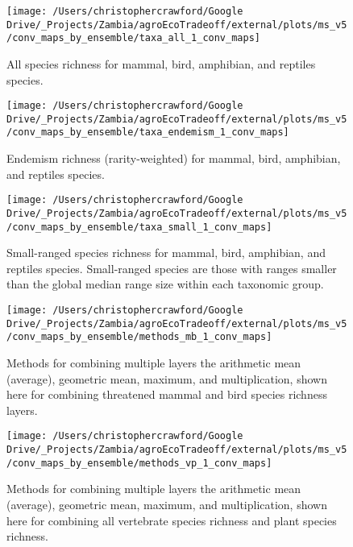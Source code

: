 \documentclass[
]{article}
\begin{document}
\begin{figure}
\texttt{[image: /Users/christophercrawford/Google Drive/\_Projects/Zambia/agroEcoTradeoff/external/plots/ms\_v5/conv\_maps\_by\_ensemble/taxa\_all\_1\_conv\_maps]} \caption{All species richness for mammal, bird, amphibian, and reptiles species.}\label{fig:conv-maps-taxa-all-1}
\end{figure}

\begin{figure}
\texttt{[image: /Users/christophercrawford/Google Drive/\_Projects/Zambia/agroEcoTradeoff/external/plots/ms\_v5/conv\_maps\_by\_ensemble/taxa\_endemism\_1\_conv\_maps]} \caption{Endemism richness (rarity-weighted) for mammal, bird, amphibian, and reptiles species.}\label{fig:conv-maps-taxa-endemism-1}
\end{figure}

\begin{figure}
\texttt{[image: /Users/christophercrawford/Google Drive/\_Projects/Zambia/agroEcoTradeoff/external/plots/ms\_v5/conv\_maps\_by\_ensemble/taxa\_small\_1\_conv\_maps]} \caption{Small-ranged species richness for mammal, bird, amphibian, and reptiles species. Small-ranged species are those with ranges smaller than the global median range size within each taxonomic group.}\label{fig:conv-maps-taxa-small-1}
\end{figure}

\begin{figure}
\texttt{[image: /Users/christophercrawford/Google Drive/\_Projects/Zambia/agroEcoTradeoff/external/plots/ms\_v5/conv\_maps\_by\_ensemble/methods\_mb\_1\_conv\_maps]} \caption{Methods for combining multiple layers the arithmetic mean (average), geometric mean, maximum, and multiplication, shown here for combining threatened mammal and bird species richness layers.}\label{fig:conv-maps-methods-mb-1}
\end{figure}

\begin{figure}
\texttt{[image: /Users/christophercrawford/Google Drive/\_Projects/Zambia/agroEcoTradeoff/external/plots/ms\_v5/conv\_maps\_by\_ensemble/methods\_vp\_1\_conv\_maps]} \caption{Methods for combining multiple layers the arithmetic mean (average), geometric mean, maximum, and multiplication, shown here for combining all vertebrate species richness and plant species richness.}\label{fig:conv-maps-methods-vp-1}
\end{figure}
\end{document}
